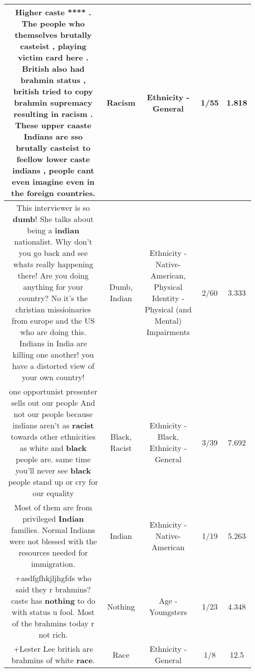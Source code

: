 \documentclass[11pt]{article}
\newlength\mylength
\begin{document}
\begin{center}
\begin{longtable}{|C{.65\mylength}|C{.30\mylength}|C{.12\mylength}|C{.12\mylength}|C{.12\mylength}|}
  \small Higher caste **** . The people who  themselves brutally casteist , playing victim card here . British also had brahmin status , british tried to copy brahmin supremacy resulting in \textbf{racism} . These upper caaste Indians are sso brutally casteist to feellow lower caste indians , people cant even imagine even in the foreign countries.\normalsize   & Racism & Ethnicity - General & 1/55 & 1.818 \\  \hline
  \small This interviewer is so \textbf{dumb}! She talks about being a \textbf{indian} nationalist. Why don't you go back and see whats really happening there! Are you doing anything for your country? No it's the christian missioinaries from europe and the US who are doing this. Indians in India are killing one another! you have a distorted view of your own country!\normalsize   & Dumb, Indian & Ethnicity - Native-American, Physical Identity - Physical (and Mental) Impairments & 2/60 & 3.333 \\  \hline
  \small one opportunist presenter sells out our people And not our people because indians aren't as \textbf{racist} towards other ethnicities as white and \textbf{black} people are. same time you'll never see \textbf{black} people stand up or cry for our equality\normalsize   & Black, Racist & Ethnicity - Black, Ethnicity - General & 3/39 & 7.692 \\  \hline
  \small Most of them are from privileged \textbf{Indian} families. Normal Indians were not blessed with the resources needed for immigration.\normalsize   & Indian & Ethnicity - Native-American & 1/19 & 5.263 \\  \hline
  \small +asdfgfhkjljhgfds who said they r brahmins? caste has \textbf{nothing} to do with status u fool. Most of the brahmins today r not rich.\normalsize   & Nothing & Age - Youngsters & 1/23 & 4.348 \\  \hline
  \small +Lester Lee british are brahmins of white \textbf{race}.\normalsize   & Race & Ethnicity - General & 1/8 & 12.5 \\  \hline

\end{longtable}
\end{center}
\end{document}
